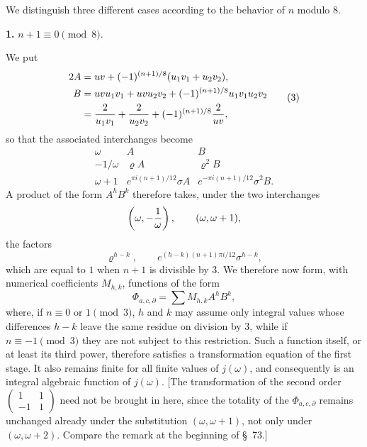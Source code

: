 \documentclass[11pt]{article}
\begin{document}
We distinguish three different cases according to the behavior of $n$ modulo $8$.

\medskip
\noindent\textbf{1.} $n+1\equiv0\pmod8$.

We put
\begin{equation}
\begin{aligned}
 2A&=uv+(-1)^{(n+1)/8}(u_1v_1+u_2v_2),\\
 B&=uvu_1v_1+uvu_2v_2+(-1)^{(n+1)/8}u_1v_1u_2v_2\\
 &= {2\over u_1v_1}+{2\over u_2v_2}+(-1)^{(n+1)/8}{2\over uv},
\end{aligned}
\tag{3}
\end{equation}
so that the associated interchanges become
\begin{equation}
\begin{array}{c|cc}
\omega&A&B\\[0.2em]
-1/\omega&\varrho A&\varrho^2B\\[0.2em]
\omega+1&e^{\pi i(n+1)/12}\sigma A&e^{-\pi i(n+1)/12}\sigma^2B.
\end{array}
\tag{4}
\end{equation}
A product of the form $A^hB^k$ therefore takes, under the two interchanges
\[
 \left(\omega,-{1\over\omega}\right),\qquad (\omega,\omega+1),
\]
the factors
\[
 \varrho^{h-k},\qquad e^{(h-k)(n+1)\pi i/12}\sigma^{h-k},
\]
which are equal to $1$ when $n+1$ is divisible by $3$. We therefore now form, with numerical coefficients $M_{h,k}$, functions of the form
\begin{equation}
 \Phi_{a,c,\partial}=\sum M_{h,k}A^hB^k,
\tag{5}
\end{equation}
where, if $n\equiv0$ or $1\pmod3$, $h$ and $k$ may assume only integral values whose differences $h-k$ leave the same residue on division by $3$, while if $n\equiv-1\pmod3$ they are not subject to this restriction. Such a function itself, or at least its third power, therefore satisfies a transformation equation of the first stage. It also remains finite for all finite values of $j(\omega)$, and consequently is an integral algebraic function of $j(\omega)$. [The transformation of the second order $\begin{pmatrix}1&1\\-1&1\end{pmatrix}$ need not be brought in here, since the totality of the $\Phi_{a,c,\partial}$ remains unchanged already under the substitution $(\omega,\omega+1)$, not only under $(\omega,\omega+2)$. Compare the remark at the beginning of \S~73.]
\end{document}
